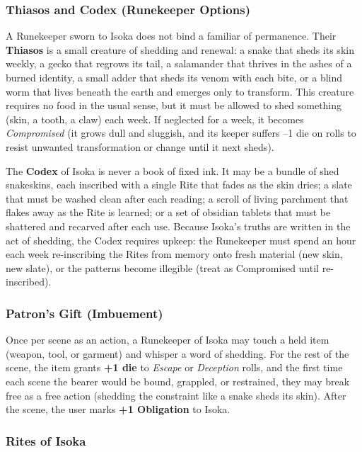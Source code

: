 \subsubsection*{Thiasos and Codex (Runekeeper Options)}

A Runekeeper sworn to Isoka does not bind a familiar of permanence. Their \textbf{Thiasos} is a small creature of shedding and renewal: a snake that sheds its skin weekly, a gecko that regrows its tail, a salamander that thrives in the ashes of a burned identity, a small adder that sheds its venom with each bite, or a blind worm that lives beneath the earth and emerges only to transform. This creature requires no food in the usual sense, but it must be allowed to shed something (skin, a tooth, a claw) each week. If neglected for a week, it becomes \textit{Compromised} (it grows dull and sluggish, and its keeper suffers --1 die on rolls to resist unwanted transformation or change until it next sheds).

The \textbf{Codex} of Isoka is never a book of fixed ink. It may be a bundle of shed snakeskins, each inscribed with a single Rite that fades as the skin dries; a slate that must be washed clean after each reading; a scroll of living parchment that flakes away as the Rite is learned; or a set of obsidian tablets that must be shattered and recarved after each use. Because Isoka's truths are written in the act of shedding, the Codex requires upkeep: the Runekeeper must spend an hour each week re-inscribing the Rites from memory onto fresh material (new skin, new slate), or the patterns become illegible (treat as Compromised until re-inscribed).

\subsubsection*{Patron's Gift (Imbuement)}

Once per scene as an action, a Runekeeper of Isoka may touch a held item (weapon, tool, or garment) and whisper a word of shedding. For the rest of the scene, the item grants \textbf{+1 die} to \textit{Escape} or \textit{Deception} rolls, and the first time each scene the bearer would be bound, grappled, or restrained, they may break free as a free action (shedding the constraint like a snake sheds its skin). After the scene, the user marks \textbf{+1 Obligation} to Isoka.

\subsubsection*{Rites of Isoka}


